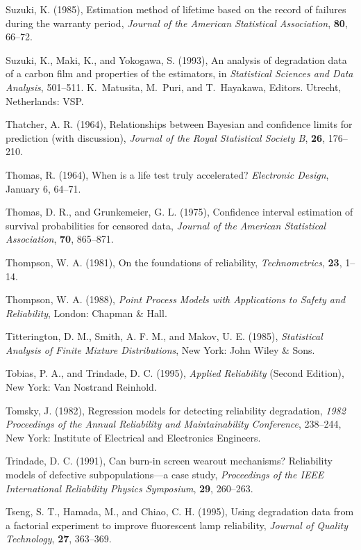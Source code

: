 \begin{thebibliography}{999}
Suzuki, K. (1985), Estimation method of lifetime based on the
record of failures during the warranty period, {\em Journal of the
American Statistical Association}, {\bf 80}, 66--72.

Suzuki, K., Maki, K., and Yokogawa, S. (1993), An analysis of
degradation data of a carbon film and properties of the estimators, in
{\em Statistical Sciences and Data Analysis}, 501--511. K.~Matusita, M.~Puri,
and T.~Hayakawa, Editors.  Utrecht, Netherlands: VSP.

Thatcher, A. R. (1964), Relationships between Bayesian and confidence
limits for prediction (with discussion), {\em Journal of the Royal
Statistical Society B}, {\bf 26}, 176--210.

Thomas, R. (1964), When is a life test truly accelerated? {\em
Electronic Design}, January 6,  64--71.

Thomas, D. R., and Grunkemeier, G. L. (1975), Confidence interval
estimation of survival probabilities for censored data, {\em Journal
of the American Statistical Association}, {\bf 70}, 865--871.

Thompson, W. A. (1981), On the foundations of reliability, {\em
Technometrics}, {\bf 23}, 1--14.

Thompson, W. A. (1988), {\em Point Process Models with Applications to
Safety and Reliability}, London: Chapman \& Hall.

Titterington, D. M., Smith, A. F. M., and Makov, U. E. (1985), {\em
Statistical Analysis of Finite Mixture Distributions}, New York: John
Wiley \& Sons.

Tobias, P. A., and Trindade, D. C. (1995), {\em Applied Reliability}
(Second Edition), New York: Van Nostrand Reinhold.

Tomsky, J. (1982), Regression models for detecting reliability
degradation, {\em 1982 Proceedings of the Annual Reliability and
Maintainability Conference},  238--244, New York: Institute of
Electrical and Electronics Engineers.

Trindade, D. C. (1991), Can burn-in screen wearout mechanisms?
Reliability models of defective subpopulations---a case study, {\em
Proceedings of the IEEE International Reliability Physics
Symposium}, {\bf 29}, 260--263.

Tseng, S. T., Hamada, M., and Chiao, C. H. (1995), Using degradation
data from a factorial experiment to improve fluorescent lamp
reliability, {\em Journal of Quality Technology}, {\bf 27}, 363--369.


\end{thebibliography}
